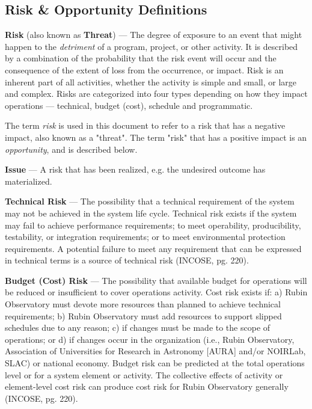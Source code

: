 \subsection{Risk \& Opportunity Definitions}
\label{sec:definitions}

\textbf{Risk} (also known as \textbf{Threat}) ---
The degree of exposure to an event that might happen to the \emph{detriment} of a program, project, or other activity. 
It is described by a combination of the probability that the risk event will occur and the consequence of the extent of loss from the occurrence, or impact.
Risk is an inherent part of all activities, whether the activity is simple and small, or large and complex.
Risks are categorized into four types depending on how they impact operations --- technical, budget (cost), schedule and programmatic.

The term \emph{risk} is used in this document to refer to a risk that has a negative impact, also known as a "threat". 
The term "risk" that has a positive impact is an \emph{opportunity}, and is described below.

\textbf{Issue} ---
A risk that has been realized, e.g. the undesired outcome has materialized.

\textbf{Technical Risk} ---
The possibility that a technical requirement of the system may not be achieved in the system life cycle.
Technical risk exists if the system may fail to achieve performance requirements; to meet operability, producibility, testability, or integration requirements; or to meet environmental protection requirements.
A potential failure to meet any requirement that can be expressed in technical terms is a source of technical risk (INCOSE, pg. 220).

\textbf{Budget (Cost) Risk} ---
The possibility that available budget for operations will be reduced or insufficient to cover operations activity.
Cost risk exists if: a) Rubin Observatory must devote more resources than planned to achieve technical requirements; b) Rubin Observatory must add resources to support slipped schedules due to any reason; c) if changes must be made to the scope of operations; or d) if changes occur in the organization (i.e., Rubin Observatory, Association of Universities for Research in Astronomy [AURA] and/or NOIRLab, SLAC) or national economy.
Budget risk can be predicted at the total operations level or for a system element or activity.
The collective effects of activity or element-level cost risk can produce cost risk for Rubin Observatory generally (INCOSE, pg. 220).

